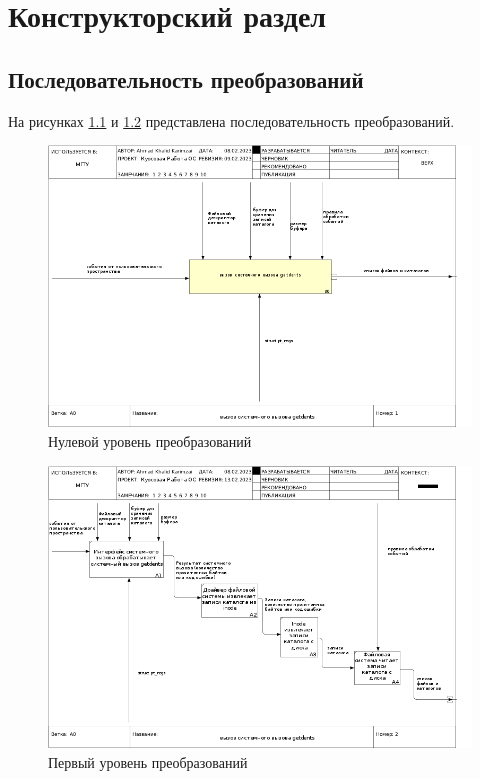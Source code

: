 \chapter{Конструкторский раздел}%
\label{cha:konstruktorskii_razdel}


\section{Последовательность преобразований}

На рисунках \ref{img:idef01} и \ref{img:idef02} представлена последовательность преобразований.

\begin{figure}[H]
    \centering
    \includegraphics[scale=0.65]{idef/01_A0.png}
    \caption{Нулевой уровень преобразований}\label{img:idef01}
\end{figure}

\begin{figure}[H]
    \centering
    \includegraphics[scale=0.65]{idef/02_A0.png}
    \caption{Первый уровень преобразований}\label{img:idef02}
\end{figure}


